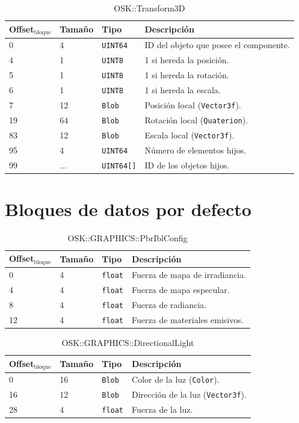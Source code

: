\documentclass[12pt,a4paper]{article}
\begin{document}
\begin{table}[h]
\caption{OSK::Transform3D}
\center
\begin{tabular}{llll}
\hline
Offset$_\text{bloque}$ & Tamaño & Tipo & Descripción \\ \hline
0 & 4 & \texttt{UINT64} & ID del objeto que posee el componente. \\
4 & 1 & \texttt{UINT8} & 1 si hereda la posición. \\
5 & 1 & \texttt{UINT8} & 1 si hereda la rotación. \\
6 & 1 & \texttt{UINT8} & 1 si hereda la escala. \\
7 & 12 & \texttt{Blob} & Posición local (\texttt{Vector3f}). \\
19 & 64 & \texttt{Blob} & Rotación local (\texttt{Quaterion}). \\
83 & 12 & \texttt{Blob} & Escala local (\texttt{Vector3f}). \\
95 & 4 & \texttt{UINT64} & Número de elementos hijos. \\
99 & ... & \texttt{UINT64[]} & ID de los objetos hijos. \\
\hline
\end{tabular}
\end{table}


\pagebreak
\section{Bloques de datos por defecto}

\begin{table}[h]
\caption{OSK::GRAPHICS::PbrIblConfig}
\center
\begin{tabular}{llll}
\hline
Offset$_\text{bloque}$ & Tamaño & Tipo & Descripción \\ \hline
0 & 4 & \texttt{float} & Fuerza de mapa de irradiancia. \\
4 & 4 & \texttt{float} & Fuerza de mapa especular. \\
8 & 4 & \texttt{float} & Fuerza de radiancia. \\
12 & 4 & \texttt{float} & Fuerza de materiales emisivos. \\
\hline
\end{tabular}
\end{table}

\begin{table}[h]
\caption{OSK::GRAPHICS::DirectionalLight}
\center
\begin{tabular}{llll}
\hline
Offset$_\text{bloque}$ & Tamaño & Tipo & Descripción \\ \hline
0 & 16 & \texttt{Blob} & Color de la luz (\texttt{Color}). \\
16 & 12 & \texttt{Blob} & Dirección de la luz (\texttt{Vector3f}). \\
28 & 4 & \texttt{float} & Fuerza de la luz. \\
\hline
\end{tabular}
\end{table}
\end{document}
